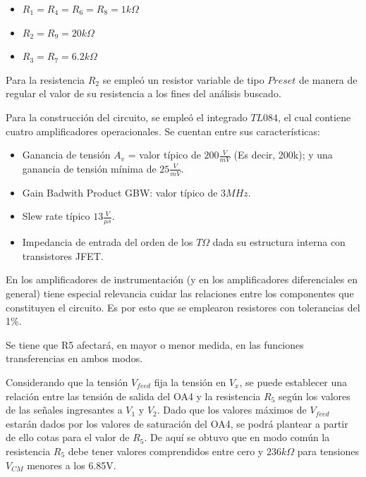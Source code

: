 \begin{itemize}
    \item $R_{1} = R_{4} = R_{6} = R_{8} = 1k\Omega$
\end{itemize}
\begin{itemize}
    \item $R_{2} = R_{9} = 20k\Omega$
\end{itemize}
\begin{itemize}
    \item $R_{3} = R_{7} = 6.2k\Omega$
\end{itemize}

Para la resistencia $R_{2}$ se empleó un resistor variable de tipo $Preset$ de manera de regular el valor de su resistencia a los fines del análisis buscado. 

Para la construcción del circuito, se empleó el integrado $TL084$, el cual contiene cuatro amplificadores operacionales. Se cuentan entre sus características:

\begin{itemize}
    \item Ganancia de tensión $A_{v}$ = valor típico de $200\frac{V}{mV}$ (Es decir, 200k); y una ganancia de tensión mínima de $25\frac{V}{mV}$. 
\end{itemize}
\begin{itemize}
    \item Gain Badwith Product GBW: valor típico de 3$MHz$.
\end{itemize}
\begin{itemize}
    \item Slew rate típico $13\frac{V}{\mu s}$.
\end{itemize}
\begin{itemize}
    \item Impedancia de entrada del orden de los $T\Omega$ dada su estructura interna con transistores JFET.
\end{itemize}

En los amplificadores de instrumentación (y en los amplificadores diferenciales en general) tiene especial relevancia cuidar las relaciones entre los componentes que constituyen el circuito. Es por esto que se emplearon resistores con tolerancias del 1\%. 


Se tiene que R5 afectará, en mayor o menor medida, en las funciones transferencias en ambos modos.

Considerando que la tensión $V_{feed}$ fija la tensión en $V_{x}$, se puede establecer una relación entre las tensión de salida del OA4 y la resistencia $R_{5}$ según los valores de las señales ingresantes a 
$V_{1}$ y $V_{2}$. Dado que los valores máximos de $V_{feed}$ estarán dados por los valores de saturación del OA4, se podrá plantear a partir de ello cotas para el valor de $R_{5}$. De aquí se obtuvo que en modo común la resistencia $R_{5}$ debe tener valores comprendidos entre cero
y $236k\Omega$ para tensiones $V_{CM}$ menores a los 6.85V. 

